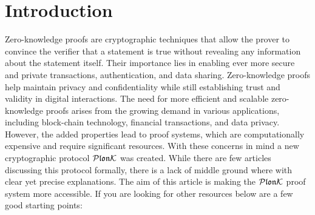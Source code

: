 \chapter{Introduction}

\label{Chapter1}

Zero-knowledge proofs are cryptographic techniques that allow the prover to convince the verifier that a statement is true without revealing any information about the statement itself. Their importance lies in enabling ever more secure and private transactions, authentication, and data sharing. Zero-knowledge proofs help maintain privacy and confidentiality while still establishing trust and validity in digital interactions. The need for more efficient and scalable zero-knowledge proofs arises from the growing demand in various applications, including block-chain technology, financial transactions, and data privacy. However, the added properties lead to proof systems, which are computationally expensive and require significant resources. With these concerns in mind a new cryptographic protocol $\mathcal{P}\mathfrak{lon}\mathcal{K}$ was created. While there are few articles discussing this protocol formally, there is a lack of middle ground where with clear yet precise explanations. The aim of this article is making the $\mathcal{P}\mathfrak{lon}\mathcal{K}$ proof system more accessible. If you are looking for other resources below are a few good starting points:

